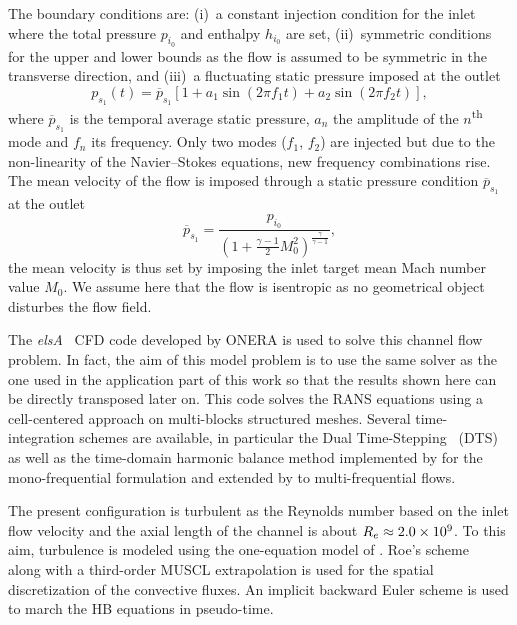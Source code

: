 The boundary conditions are: (i)~a constant injection condition for the inlet
where the total pressure $p_{i_0}$ and enthalpy $h_{i_0}$ are set,
(ii)~symmetric conditions for the upper and lower bounds as the flow
is assumed to be symmetric in the transverse direction, and (iii)~a
fluctuating static pressure imposed at the outlet
\begin{equation}
  p_{s_1}(t) = \overline{p}_{s_1} \left[1 + a_1 \sin(2 \pi f_1 t) +
    a_2 \sin(2 \pi f_2 t) \right],
  \label{eq:outlet_canal}
\end{equation}
where $\overline{p}_{s_1}$ is the temporal average static pressure, $a_n$ the
amplitude of the $n$\textsuperscript{th} mode and $f_n$ its
frequency. Only two modes ($f_1$, $f_2$) are injected
but due to the non-linearity of the Navier--Stokes equations,
new frequency combinations rise.
The mean velocity of the flow is imposed through a
static pressure condition $\overline{p}_{s_1}$ at the outlet
\begin{equation}
    \overline{p}_{s_1} = \frac{p_{i_0}}{\left(1 + 
    \frac{\gamma - 1}{2} M_{0}^2 \right) ^ {\frac{\gamma}{ \gamma - 1}}} ,
\end{equation}
the mean velocity is thus set by imposing the
inlet target mean Mach number value $M_{0}$.
We assume here that the flow is isentropic as no
geometrical object disturbes the flow field.

The \textit{elsA}~\cite{Cambier2013} CFD code developed by ONERA
is used to solve this channel flow problem. In fact, 
the aim of this model problem is 
to use the same
solver as the one used in the application part of this
work so that the results shown here can be directly
transposed later on.
This code solves the RANS equations using a cell-centered
approach on multi-blocks structured meshes.
Several time-integration schemes
are available, in particular the Dual Time-Stepping~\cite{Jameson1981} (DTS)
as well as the time-domain harmonic 
balance method implemented by \citet{JSicot2008} for the mono-frequential
formulation and extended by \citet{JGuedeney2013} to multi-frequential flows. 


The present configuration is turbulent as the Reynolds number based on the
inlet flow velocity and the axial length of the channel is about $R_e
\approx 2.0\times 10^{9}$. To this aim, turbulence is modeled using the
one-equation model of \citet{Spalart1992}.
Roe's scheme~\cite{Roe1981} along with a third-order MUSCL extrapolation 
is used for the spatial discretization of
the convective fluxes. An implicit backward Euler scheme is used
to march the HB equations in pseudo-time.

